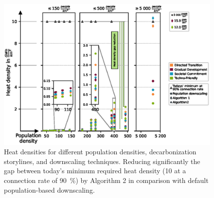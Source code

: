 \begin{figure}
	\centering
	\includegraphics[width=1\linewidth]{figures/4_Results/Heat_density_gap.eps}
	\caption{Heat densities for different population densities, decarbonization storylines, and downscaling techniques. Reducing significantly the gap between today's minimum required heat density (\SI{10}{} at a connection rate of \SI{90}{\%}) by Algorithm 2 in comparison with default population-based downscaling.}
	\label{fig:res4}
\end{figure}
